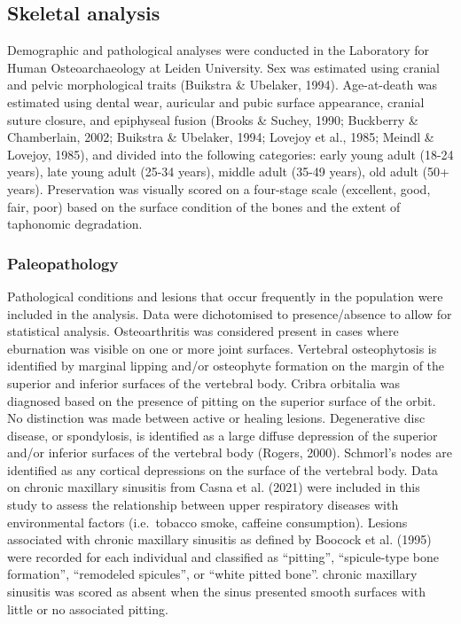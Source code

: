\documentclass[
]{article}
\begin{document}
\subsection{Skeletal analysis}\label{skeletal-analysis}

Demographic and pathological analyses were conducted in the Laboratory
for Human Osteoarchaeology at Leiden University. Sex was estimated using
cranial and pelvic morphological traits (Buikstra \& Ubelaker, 1994).
Age-at-death was estimated using dental wear, auricular and pubic
surface appearance, cranial suture closure, and epiphyseal fusion
(Brooks \& Suchey, 1990; Buckberry \& Chamberlain, 2002; Buikstra \&
Ubelaker, 1994; Lovejoy et al., 1985; Meindl \& Lovejoy, 1985), and
divided into the following categories: early young adult (18-24 years),
late young adult (25-34 years), middle adult (35-49 years), old adult
(50+ years). Preservation was visually scored on a four-stage scale
(excellent, good, fair, poor) based on the surface condition of the
bones and the extent of taphonomic degradation.

\subsubsection{Paleopathology}\label{paleopathology}

Pathological conditions and lesions that occur frequently in the
population were included in the analysis. Data were dichotomised to
presence/absence to allow for statistical analysis. Osteoarthritis was
considered present in cases where eburnation was visible on one or more
joint surfaces. Vertebral osteophytosis is identified by marginal
lipping and/or osteophyte formation on the margin of the superior and
inferior surfaces of the vertebral body. Cribra orbitalia was diagnosed
based on the presence of pitting on the superior surface of the orbit.
No distinction was made between active or healing lesions. Degenerative
disc disease, or spondylosis, is identified as a large diffuse
depression of the superior and/or inferior surfaces of the vertebral
body (Rogers, 2000). Schmorl's nodes are identified as any cortical
depressions on the surface of the vertebral body. Data on chronic
maxillary sinusitis from Casna et al. (2021) were included in this study
to assess the relationship between upper respiratory diseases with
environmental factors (i.e.~tobacco smoke, caffeine consumption).
Lesions associated with chronic maxillary sinusitis as defined by
Boocock et al. (1995) were recorded for each individual and classified
as ``pitting'', ``spicule-type bone formation'', ``remodeled spicules'',
or ``white pitted bone''. chronic maxillary sinusitis was scored as
absent when the sinus presented smooth surfaces with little or no
associated pitting.
\end{document}
